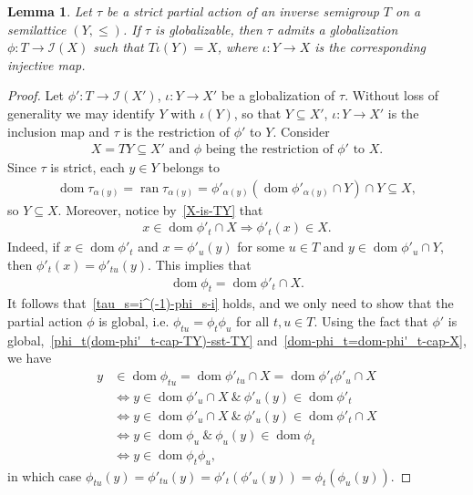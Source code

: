 \documentclass[reqno]{amsart}
\newtheorem{lem}[thrm]{Lemma}
\theoremstyle{definition}
\renewcommand{\iff}{\Leftrightarrow}
\newcommand{\impl}{\Rightarrow}
\newcommand{\cI}[1]{\mathcal I{(#1)}}
\newcommand{\dom}[1]{\operatorname{\mathrm{dom}}{#1}}
\newcommand{\ran}[1]{\operatorname{\mathrm{ran}}{#1}}
\newcommand{\0}{\theta}
\newcommand{\io}{\iota}
\newcommand{\af}{\alpha}
\newcommand{\sst}{\subseteq}
\begin{document}
\begin{lem}\label{glob-with-T-iota(Y)=X}
	Let $\tau$ be a strict partial action of an inverse semigroup $T$ on a semilattice $(Y,\le)$. If $\tau$ is globalizable, then $\tau$ admits a globalization $\phi:T\to \cI X$ such that $T\io(Y)=X$, where $\io:Y\to X$ is the corresponding injective map.
\end{lem}
\begin{proof}
	Let $\phi':T\to\cI {X'}$, $\io:Y\to X'$ be a globalization of $\tau$. Without loss of generality we may identify $Y$ with $\io(Y)$, so that $Y\sst X'$, $\io:Y\to X'$ is the inclusion map and $\tau$ is the restriction of $\phi'$ to $Y$. Consider 
	\begin{align}\label{X-is-TY}
	X=TY\sst X'\mbox{ and }\phi\mbox{ being the restriction of }\phi'\mbox{ to }X.
	\end{align}
	Since $\tau$ is strict, each $y\in Y$ belongs to 
	\begin{align*}
	\dom{\tau_{\af(y)}}=\ran{\tau_{\af(y)}}=\phi'_{\af(y)}(\dom{\phi'_{\af(y)}}\cap Y)\cap Y\sst X,
	\end{align*}
	so $Y\sst X$. Moreover, notice by~\eqref{X-is-TY} that
	\begin{align}\label{phi_t(dom-phi'_t-cap-TY)-sst-TY}
	x\in\dom{\phi'_t}\cap X\impl \phi'_t(x)\in X.
	\end{align}
	Indeed, if $x\in\dom{\phi'_t}$ and $x=\phi'_u(y)$ for some $u\in T$ and $y\in\dom{\phi'_u}\cap Y$, then $\phi'_t(x)=\phi'_{tu}(y)$. This implies that
	\begin{align}\label{dom-phi_t=dom-phi'_t-cap-X}
	\dom{\phi_t}=\dom{\phi'_t}\cap X.
	\end{align}
	It follows that~\eqref{tau_s=i^(-1)-phi_s-i} holds, and we only need to show that the partial action $\phi$ is global, i.e. $\phi_{tu}=\phi_t\phi_u$ for all $t,u\in T$. Using the fact that $\phi'$ is global,~\eqref{phi_t(dom-phi'_t-cap-TY)-sst-TY} and~\eqref{dom-phi_t=dom-phi'_t-cap-X}, we have
	\begin{align*}
	y&\in\dom{\phi_{tu}}=\dom{\phi'_{tu}}\cap X=\dom{\phi'_t\phi'_u}\cap X\\
	&\iff y\in\dom{\phi'_u}\cap X\ \&\ \phi'_u(y)\in\dom{\phi'_t}\\
	&\iff y\in\dom{\phi'_u}\cap X\ \&\ \phi'_u(y)\in\dom{\phi'_t}\cap X\\
	&\iff y\in\dom{\phi_u}\ \&\ \phi_u(y)\in\dom{\phi_t}\\
	&\iff y\in\dom{\phi_t\phi_u},
	\end{align*}
	in which case $\phi_{tu}(y)=\phi'_{tu}(y)=\phi'_t(\phi'_u(y))=\phi_t(\phi_u(y))$.
\end{proof}
\end{document}
